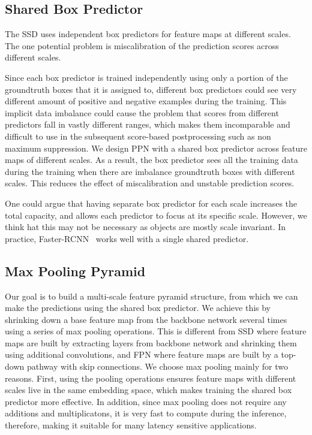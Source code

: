\documentclass[10pt,twocolumn,letterpaper]{article}
\begin{document}
\subsection{Shared Box Predictor}
The SSD uses independent box predictors for feature maps at different scales.
The one potential problem is miscalibration of the prediction scores across different scales.

Since each box predictor is trained independently using only
a portion of the groundtruth boxes that it is assigned to,
different box predictors could see very different amount of
positive and negative examples during the training.  This
implicit data imbalance could cause the problem that scores
from different predictors fall in vastly different ranges,
which makes them incomparable and difficult to use in the
subsequent score-based postprocessing such as non maximum
suppression.  We design PPN with a shared box predictor
across feature maps of different scales.  As a result, the
box predictor sees all the training data during the training
when there are imbalance groundtruth boxes with different scales.
This reduces the effect of miscalibration and unstable prediction
scores.

One could argue that having separate box predictor for each
scale increases the total capacity, and allows each
predictor to focus at its specific scale. However, we think
hat this may not be necessary as objects are mostly scale
invariant. In practice, Faster-RCNN~\cite{ren2015frcnn}
works well with a single shared predictor.


\subsection{Max Pooling Pyramid}

Our goal is to build a multi-scale feature pyramid
structure, from which we can make the predictions using the
shared box predictor.  We achieve this by shrinking down a
base feature map from the backbone network several times
using a series of max pooling operations.  This is different
from SSD where feature maps are built by extracting layers
from backbone network and shrinking them using additional
convolutions, and FPN where feature maps are built by a
top-down pathway with skip connections.  We choose max
pooling mainly for two reasons.  First, using the pooling
operations ensures feature maps with different scales live
in the same embedding space, which makes training the shared
box predictor more effective.  In addition, since max
pooling does not require any additions and multiplicatons,
it is very fast to compute during the inference, therefore,
making it suitable for many latency sensitive applications.
\end{document}
